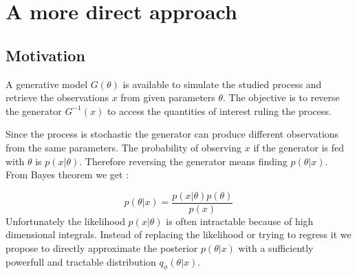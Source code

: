 
\chapter{A more direct approach}
\label{chap:direct_approach}

\ifpdf
    \graphicspath{{Chapter3/Figs/Raster/}{Chapter3/Figs/PDF/}{Chapter3/Figs/}}
\else
    \graphicspath{{Chapter3/Figs/Vector/}{Chapter3/Figs/}}
\fi



\section{Motivation} %
\label{sec:motivation}



A generative model $G(\theta)$ is available to simulate the studied process and retrieve the observations $x$ from given parameters $\theta$.
The objective is to reverse the generator $G^{-1}(x)$ to access the quantities of interest ruling the process.

Since the process is stochastic the generator can produce different observations from the same parameters.
The probability of observing $x$ if the generator is fed with $\theta$ is $p(x | \theta)$.
Therefore reversing the generator means finding $p(\theta | x)$.
From Bayes theorem we get :

\begin{equation}
    p(\theta | x) = \frac{p(x | \theta) p(\theta) }{p(x)}
\end{equation}
Unfortunately the likelihood $p(x | \theta)$ is often intractable because of high dimensional integrals.
Instead of replacing the likelihood or trying to regress it we propose to directly approximate the posterior $p(\theta | x)$ with a sufficiently powerfull and tractable distribution $q_\phi(\theta | x)$.


